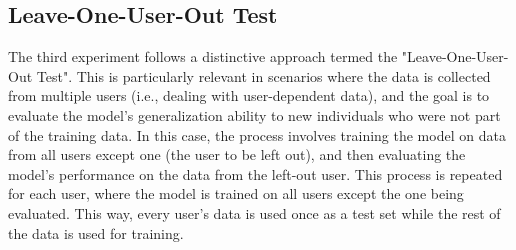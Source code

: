 
\subsection{Leave-One-User-Out Test}
The third experiment follows a distinctive approach termed the "Leave-One-User-Out Test". This is particularly relevant in scenarios where the data is collected from multiple users (i.e., dealing with user-dependent data), and the goal is to evaluate the model's generalization ability to new individuals who were not part of the training data. In this case, the process involves training the model on data from all users except one (the user to be left out), and then evaluating the model's performance on the data from the left-out user. This process is repeated for each user, where the model is trained on all users except the one being evaluated. This way, every user's data is used once as a test set while the rest of the data is used for training.

